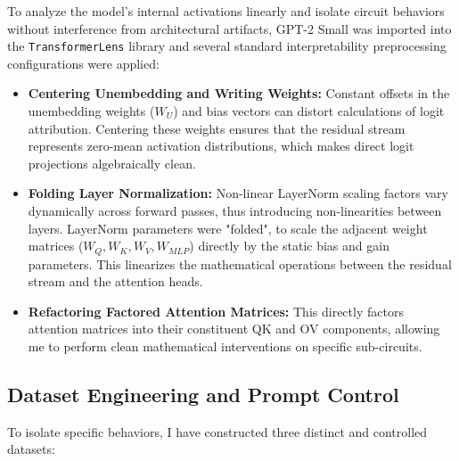 \documentclass[11pt]{article}
\begin{document}
To analyze the model's internal activations linearly and isolate circuit behaviors without interference from architectural artifacts, GPT-2 Small was imported into the \texttt{TransformerLens} library and several standard interpretability preprocessing configurations were applied:
\begin{itemize}
    \item \textbf{Centering Unembedding and Writing Weights:} Constant offsets in the unembedding weights ($W_U$) and bias vectors can distort calculations of logit attribution. Centering these weights ensures that the residual stream represents zero-mean activation distributions, which makes direct logit projections algebraically clean.
    \item \textbf{Folding Layer Normalization:} Non-linear LayerNorm scaling factors vary dynamically across forward passes, thus introducing non-linearities between layers. LayerNorm parameters were "folded", to scale the adjacent weight matrices ($W_Q, W_K, W_V, W_{MLP}$) directly by the static bias and gain parameters. This linearizes the mathematical operations between the residual stream and the attention heads.
    \item \textbf{Refactoring Factored Attention Matrices:} This directly factors attention matrices into their constituent QK and OV components, allowing me to perform clean mathematical interventions on specific sub-circuits.
\end{itemize}

\subsection{Dataset Engineering and Prompt Control}

To isolate specific behaviors, I have constructed three distinct and controlled datasets:
\end{document}
